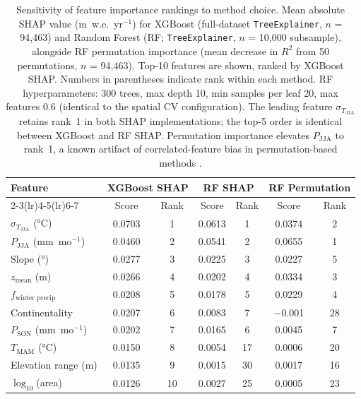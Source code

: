 \begin{table}[htbp]
\centering
\caption{Sensitivity of feature importance rankings to method choice.
Mean absolute SHAP value (m~w.e.~yr$^{-1}$) for XGBoost (full-dataset
\texttt{TreeExplainer}, $n$ = 94,463) and Random Forest (RF;
\texttt{TreeExplainer}, $n$ = 10,000 subsample), alongside RF permutation
importance (mean decrease in $R^2$ from 50 permutations, $n$ = 94,463).
Top-10 features are shown, ranked by XGBoost SHAP.
Numbers in parentheses indicate rank within each method.
RF hyperparameters: 300 trees, max depth 10, min samples per leaf 20,
max features 0.6 (identical to the spatial CV configuration).
The leading feature $\sigma_{T_\text{JJA}}$ retains rank~1 in both SHAP
implementations; the top-5 order is identical between XGBoost and RF SHAP.
Permutation importance elevates $P_\text{JJA}$ to rank~1, a known
artifact of correlated-feature bias in permutation-based methods
\cite{Strobl2008,Hooker2021}.}
\label{tab:shap_sensitivity}
\small
\begin{tabular}{lcccccc}
\toprule
Feature &
\multicolumn{2}{c}{XGBoost SHAP} &
\multicolumn{2}{c}{RF SHAP} &
\multicolumn{2}{c}{RF Permutation} \\
\cmidrule(lr){2-3}\cmidrule(lr){4-5}\cmidrule(lr){6-7}
 & Score & Rank & Score & Rank & Score & Rank \\
\midrule
$\sigma_{T_\text{JJA}}$ (°C)        & 0.0703 & 1 & 0.0613 & 1 & 0.0374 & 2 \\
$P_\text{JJA}$ (mm~mo$^{-1}$)       & 0.0460 & 2 & 0.0541 & 2 & 0.0655 & 1 \\
Slope (°)                            & 0.0277 & 3 & 0.0225 & 3 & 0.0227 & 5 \\
$z_\text{mean}$ (m)                  & 0.0266 & 4 & 0.0202 & 4 & 0.0334 & 3 \\
$f_\text{winter precip}$             & 0.0208 & 5 & 0.0178 & 5 & 0.0229 & 4 \\
Continentality                       & 0.0207 & 6 & 0.0083 & 7 & $-$0.001 & 28 \\
$P_\text{SON}$ (mm~mo$^{-1}$)        & 0.0202 & 7 & 0.0165 & 6 & 0.0045 & 7 \\
$T_\text{MAM}$ (°C)                  & 0.0150 & 8 & 0.0054 & 17 & 0.0006 & 20 \\
Elevation range (m)                  & 0.0135 & 9 & 0.0015 & 30 & 0.0017 & 16 \\
$\log_{10}$(area)                    & 0.0126 & 10 & 0.0027 & 25 & 0.0005 & 23 \\
\bottomrule
\end{tabular}
\end{table}

